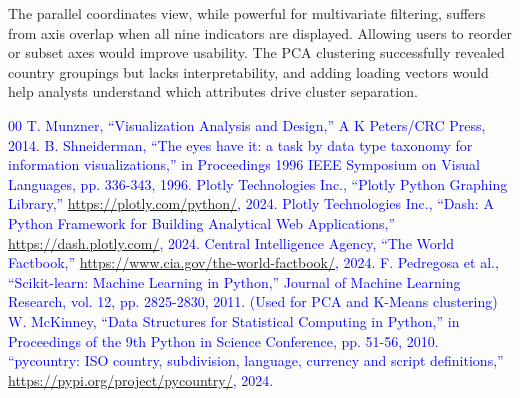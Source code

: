 \documentclass[conference]{IEEEtran}
\begin{document}
The parallel coordinates view, while powerful for multivariate filtering, suffers from axis overlap when all nine indicators are displayed. Allowing users to reorder or subset axes would improve usability. The PCA clustering successfully revealed country groupings but lacks interpretability, and adding loading vectors would help analysts understand which attributes drive cluster separation.

\textcolor{blue}{
\begin{thebibliography}{00}
 T. Munzner, ``Visualization Analysis and Design,'' A K Peters/CRC Press, 2014.
 B. Shneiderman, ``The eyes have it: a task by data type taxonomy for information visualizations,'' in Proceedings 1996 IEEE Symposium on Visual Languages, pp. 336-343, 1996.
 Plotly Technologies Inc., ``Plotly Python Graphing Library,'' \url{https://plotly.com/python/}, 2024.
 Plotly Technologies Inc., ``Dash: A Python Framework for Building Analytical Web Applications,'' \url{https://dash.plotly.com/}, 2024.
 Central Intelligence Agency, ``The World Factbook,'' \url{https://www.cia.gov/the-world-factbook/}, 2024.
 F. Pedregosa et al., ``Scikit-learn: Machine Learning in Python,'' Journal of Machine Learning Research, vol. 12, pp. 2825-2830, 2011. (Used for PCA and K-Means clustering)
 W. McKinney, ``Data Structures for Statistical Computing in Python,'' in Proceedings of the 9th Python in Science Conference, pp. 51-56, 2010.
 ``pycountry: ISO country, subdivision, language, currency and script definitions,'' \url{https://pypi.org/project/pycountry/}, 2024.
\end{thebibliography}
}
\end{document}
